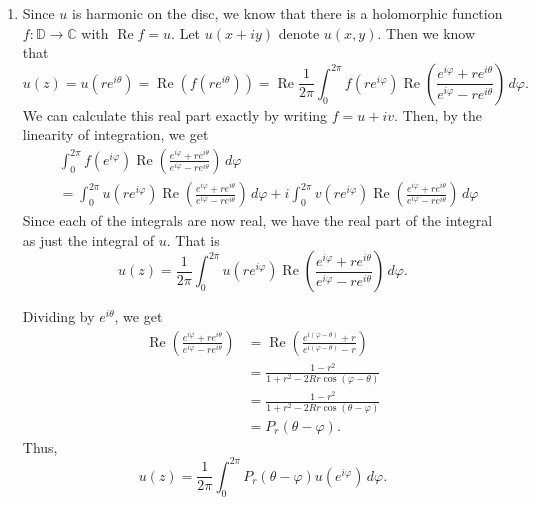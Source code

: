 \documentclass[12 pt, letterpaper]{hmcpset}
\begin{document}
\begin{solution}
\begin{enumerate}
			The Cauchy-Riemann equations fix the partials of $v = \operatorname{Im} f$ --- we must have
			\[
				\begin{split}
					\frac{\partial v}{\partial x} & = - \frac{\partial u}{\partial y} \\
					\frac{\partial v}{\partial y} & = \frac{\partial u}{\partial x}
				\end{split}
			\]
			Thus, $v$ is determined up to an additive real constant.
		\item Since $u$ is harmonic on the disc, we know that there is a holomorphic function $f : \mathbb{D} \to \mathbb{C}$ with $\operatorname{Re} f = u$. Let $u(x + i y)$ denote $u(x, y)$. Then we know that
			\[
				u(z) = u(r e^{i \theta}) = \operatorname{Re} (f(r e^{i \theta})) = \operatorname{Re} \frac{1}{2 \pi} \int_{0}^{2 \pi} f(r e^{i \varphi}) \operatorname{Re} \left ( \frac{e^{i \varphi} + r e^{i \theta}}{e^{i \varphi} - r e^{i \theta}} \right ) \, d \varphi.
			\]
			We can calculate this real part exactly by writing $f = u + iv$. Then, by the linearity of integration, we get
			\[
				\begin{split}
					& \int_{0}^{2 \pi} f(e^{i \varphi}) \operatorname{Re} \left ( \frac{e^{i \varphi} + r e^{i \theta}}{e^{i \varphi} - r e^{i \theta}} \right ) \, d \varphi \\
					& = \int_{0}^{2 \pi} u(r e^{i \varphi}) \operatorname{Re} \left ( \frac{e^{i \varphi} + r e^{i \theta}}{e^{i \varphi} - r e^{i \theta}} \right ) \, d \varphi + i \int_{0}^{2 \pi} v(r e^{i \varphi}) \operatorname{Re} \left ( \frac{e^{i \varphi} + r e^{i \theta}}{e^{i \varphi} - r e^{i \theta}} \right ) \, d \varphi
				\end{split}
			\]
			Since each of the integrals are now real, we have the real part of the integral as just the integral of $u$. That is
			\[
				u(z) = \frac{1}{2 \pi} \int_{0}^{2 \pi} u(r e^{i \varphi}) \operatorname{Re} \left ( \frac{e^{i \varphi} + r e^{i \theta}}{e^{i \varphi} - r e^{i \theta}} \right ) \, d \varphi.
			\]

			Dividing by $e^{i \theta}$, we get
			\[
				\begin{split}
					\operatorname{Re} \left ( \frac{e^{i \varphi} + r e^{i \theta}}{e^{i \varphi} - r e^{i \theta}} \right ) & = \operatorname{Re} \left ( \frac{e^{i (\varphi - \theta)} + r }{e^{i (\varphi - \theta)} - r} \right ) \\
																		 & = \frac{1 - r^{2}}{1 + r^{2} - 2 R r \cos{(\varphi - \theta)}	} \\
																		 & = \frac{1 - r^{2}}{1 + r^{2} - 2 R r \cos{(\theta - \varphi)}} \\
																		 & = P_{r}(\theta - \varphi).
				\end{split}
			\]
			Thus,
			\[
				u(z) = \frac{1}{2 \pi} \int_{0}^{2 \pi} P_{r}(\theta - \varphi) u(e^{i \varphi}) \, d \varphi.
			\]
	\end{enumerate}
\end{solution}
\end{document}
